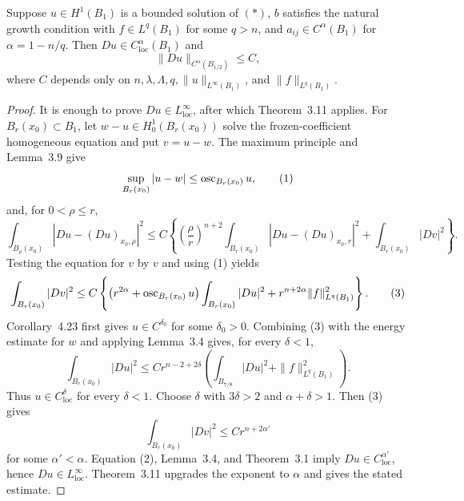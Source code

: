 \begin{theorem}\label{hanlin:weaksol-part2-nonlinear-gradient-holder}
Suppose $u\in H^1(B_1)$ is a bounded solution of $(\ast)$, $b$ satisfies
the natural growth condition with $f\in L^q(B_1)$ for some $q>n$, and
$a_{ij}\in C^\alpha(B_1)$ for $\alpha=1-n/q$. Then
$Du\in C^\alpha_{\mathrm{loc}}(B_1)$ and
\[
\|Du\|_{C^\alpha(B_{1/2})}\leq C,
\]
where $C$ depends only on
$n,\lambda,\Lambda,q,\|u\|_{L^\infty(B_1)}$, and
$\|f\|_{L^q(B_1)}$.
\end{theorem}
\begin{proof}
\sketch It is enough to prove $Du\in L^\infty_{\mathrm{loc}}$, after which
Theorem~3.11 applies. For $B_r(x_0)\subset B_1$, let
$w-u\in H^1_0(B_r(x_0))$ solve the frozen-coefficient homogeneous equation
and put $v=u-w$. The maximum principle and Lemma~3.9 give
\[
\sup_{B_r(x_0)}|u-w|\leq\operatorname{osc}_{B_r(x_0)}u,
\tag{1}
\]
and, for $0<\rho\leq r$,
\[
\int_{B_\rho(x_0)}|Du-(Du)_{x_0,\rho}|^2
\leq C\left\{
\left(\frac\rho r\right)^{n+2}
\int_{B_r(x_0)}|Du-(Du)_{x_0,r}|^2
+\int_{B_r(x_0)}|Dv|^2\right\}.
\tag{2}
\]
Testing the equation for $v$ by $v$ and using (1) yields
\[
\int_{B_r(x_0)}|Dv|^2
\leq C\left\{
\bigl(r^{2\alpha}+\operatorname{osc}_{B_r(x_0)}u\bigr)
\int_{B_r(x_0)}|Du|^2
+r^{n+2\alpha}\|f\|_{L^q(B_1)}^2\right\}.
\tag{3}
\]
Corollary~4.23 first gives $u\in C^{\delta_0}$ for some $\delta_0>0$.
Combining (3) with the energy estimate for $w$ and applying Lemma~3.4 gives,
for every $\delta<1$,
\[
\int_{B_r(x_0)}|Du|^2
\leq Cr^{n-2+2\delta}
\left(\int_{B_{7/8}}|Du|^2+\|f\|_{L^q(B_1)}^2\right).
\]
Thus $u\in C^\delta_{\mathrm{loc}}$ for every $\delta<1$. Choose
$\delta$ with $3\delta>2$ and $\alpha+\delta>1$. Then (3) gives
\[
\int_{B_r(x_0)}|Dv|^2\leq Cr^{n+2\alpha'}
\]
for some $\alpha'<\alpha$. Equation (2), Lemma~3.4, and Theorem~3.1 imply
$Du\in C^{\alpha'}_{\mathrm{loc}}$, hence
$Du\in L^\infty_{\mathrm{loc}}$. Theorem~3.11 upgrades the exponent to
$\alpha$ and gives the stated estimate.
\end{proof}
